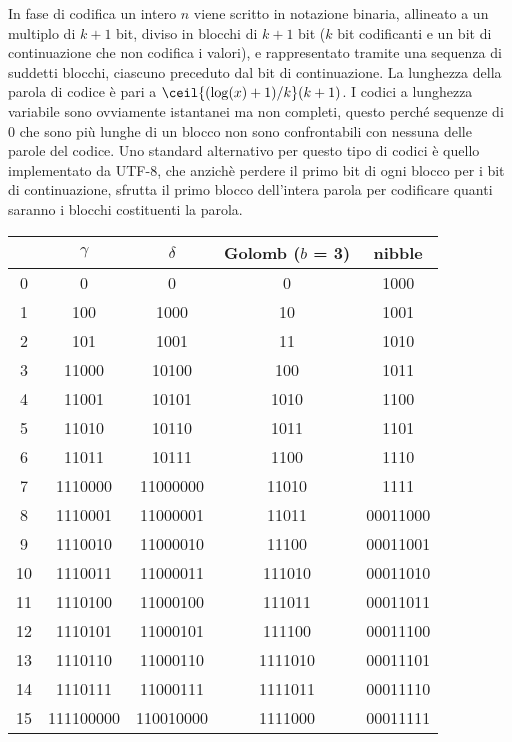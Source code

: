 In fase di codifica un intero $n$ viene scritto in notazione binaria, allineato a un multiplo di $k + 1$ bit, diviso in blocchi di $k + 1$ bit ($k$ bit codificanti e un bit di continuazione che non codifica i valori), e rappresentato tramite una sequenza di suddetti blocchi, ciascuno preceduto dal bit di continuazione. La lunghezza della parola di codice è pari a $\ceil{(\log(x) + 1) / k}(k + 1)$. I codici a lunghezza variabile sono ovviamente istantanei ma non completi, questo perché sequenze di 0 che sono più lunghe di un blocco non sono confrontabili con nessuna delle parole del codice. Uno standard alternativo per questo tipo di codici è quello implementato da UTF-8, che anzichè perdere il primo bit di ogni blocco per i bit di continuazione, sfrutta il primo blocco dell'intera parola per codificare quanti saranno i blocchi costituenti la parola.
\begin{table}[ht]
    \centering
    \begin{tabular}{|c||c|c|c|c|}
      \hline
      &$\gamma$ &$\delta$ &Golomb ($b$ = 3) &nibble \\
      \hline
      0 &0 &0 &0 &1000 \\
      1 &100 &1000 &10 &1001 \\
      2 &101 &1001 &11 &1010 \\
      3 &11000 &10100 &100 &1011 \\
      4 &11001 &10101 &1010 &1100 \\
      5 &11010 &10110 &1011 &1101 \\
      6 &11011 &10111 &1100 &1110 \\
      7 &1110000 &11000000 &11010 &1111 \\
      8 &1110001 &11000001 &11011 &00011000 \\
      9 &1110010 &11000010 &11100 &00011001 \\
      10 &1110011 &11000011 &111010 &00011010 \\
      11 &1110100 &11000100 &111011 &00011011 \\
      12 &1110101 &11000101 &111100 &00011100 \\
      13 &1110110 &11000110 &1111010 &00011101 \\
      14 &1110111 &11000111 &1111011 &00011110 \\
      15 &111100000 &110010000 &1111000 &00011111 \\
      \hline
    \end{tabular}
\end{table}
